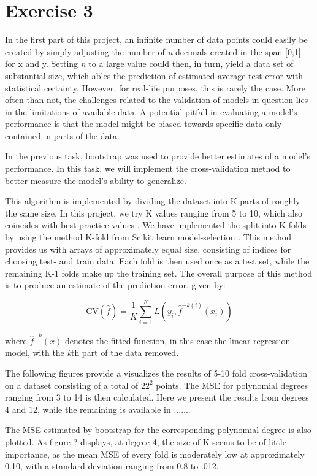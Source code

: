 \documentclass[11pt, a4paper]{article}
\begin{document}
\section*{\label{ex:3}Exercise 3}
In the first part of this project, an infinite number of data points could easily be created by simply adjusting the number of \emph{n} decimals created in the span [0,1] for x and y. Setting \emph{n} to a large value could then, in turn, yield a data set of substantial size, which ables the prediction of estimated average test error with statistical certainty. However, for real-life purposes, this is rarely the case. More often than not, the challenges related to the validation of models in question lies in the limitations of available data. A potential pitfall in evaluating a model's performance is that the model might be biased towards specific data only contained in parts of the data. 

In the previous task, bootstrap was used to provide better estimates of a model's performance.  In this task, we will implement the cross-validation method to better measure the model's ability to generalize. 

This algorithm is implemented by dividing the dataset into K parts of roughly the same size. In this project, we try K values ranging from 5 to 10, which also coincides with best-practice values \cite{Hastie2009}.  We have implemented the split into K-folds by using the method K-fold from Scikit learn model-selection \cite{link_to_doc}. This method provides us with arrays of approximately equal size, consisting of indices for choosing test- and train data.  Each fold is then used once as a test set, while the remaining K-1 folds make up the training set. The overall purpose of this method is to produce an estimate of the prediction error, given by:

\[
  \text{CV}(\hat{f}) = \frac{1}{K}
  \sum_{i=1}^{K}L(y_i,\hat{f}^{-k(i)}(x_i))
\]

where $\hat{f}^{-k}(x)$ denotes the fitted function, in this case the linear regression model, with the \emph{k}th part of the data removed.\cite{Hastie2009}  

The following figures provide a visualizes the results of 5-10 fold cross-validation on a dataset consisting of a total of $22^2$ points\cite{notebook_exc3}. The MSE for polynomial degrees ranging from 3 to 14 is then calculated. Here we present the results from degrees 4 and 12, while the remaining is available in {.......}


The MSE estimated by bootstrap for the corresponding polynomial degree is also plotted. As figure ? displays,  at degree 4, the size of K seems to be of little importance, as the mean MSE of every fold is moderately low at approximately 0.10, with a standard deviation ranging from 0.8 to .012.
\end{document}
